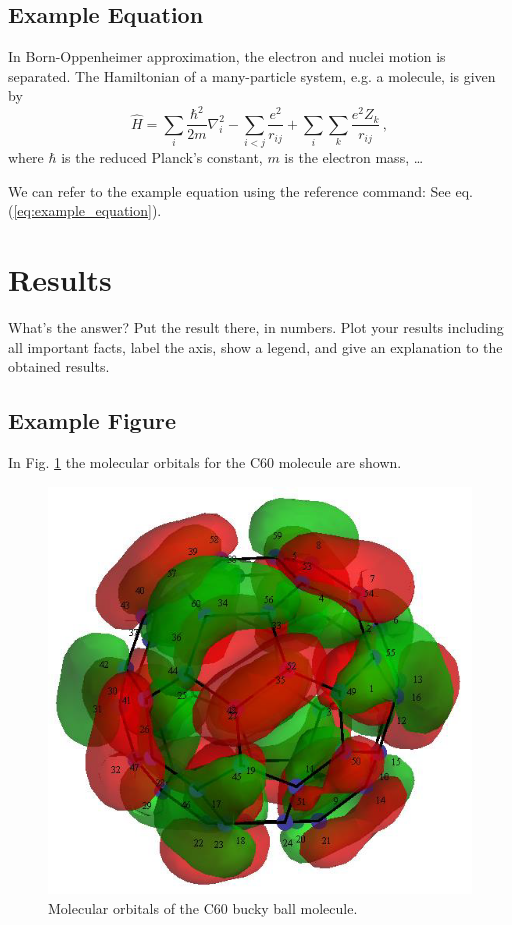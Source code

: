 \documentclass[%
 reprint,
 superscriptaddress,
 amsmath,amssymb,
pra,
]{revtex4-1}
\begin{document}
\subsection*{Example Equation}
In Born-Oppenheimer approximation, the electron and nuclei motion is separated. The Hamiltonian of a many-particle system, e.g. a molecule, is given by
\begin{equation}
\label{eq:example_equation}
    \hat{H} = \sum_i \frac{\hbar^2}{2m}\nabla_i^2 - \sum_{i<j}\frac{e^2}{r_{ij}} + \sum_{i}\sum_{k}\frac{e^2 Z_{k}}{r_{ij}} \,,
\end{equation}
where $\hbar$ is the reduced Planck's constant, $m$ is the electron mass, \dots 

We can refer to the example equation using the reference command: See eq. (\ref{eq:example_equation}).

\section{Results}
\label{sec:results}

What's the answer? Put the result there, in numbers. Plot your results including all important facts, label the axis, show a legend, and give an explanation to the obtained results.

\subsection*{Example Figure}

In Fig. \ref{fig:C60_molecular_orbitals} the molecular orbitals for the C60 molecule are shown. 

\begin{figure}[h]
    \centering
    \includegraphics[width=\columnwidth]{grafik/MO_LUMO_C60.png}
    \caption{Molecular orbitals of the C60 bucky ball molecule.}
    \label{fig:C60_molecular_orbitals}
\end{figure}
\end{document}
